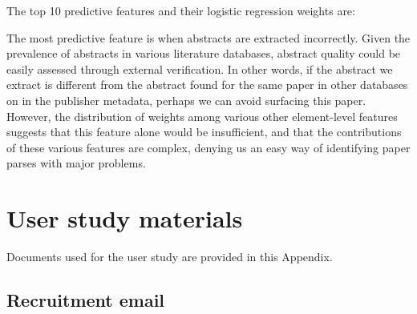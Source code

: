 The top 10 predictive features and their logistic regression weights are:

\vspace{4mm}
\vspace{4mm}

\justifying
The most predictive feature is when abstracts are extracted incorrectly. Given the prevalence of abstracts in various literature databases, abstract quality could be easily assessed through external verification. In other words, if the abstract we extract is different from the abstract found for the same paper in other databases on in the publisher metadata, perhaps we can avoid surfacing this paper. However, the distribution of weights among various other element-level features suggests that this feature alone would be insufficient, and that the contributions of these various features are complex, denying us an easy way of identifying paper parses with major problems.

\section{User study materials}
\label{app:user_study_supplement}

Documents used for the user study are provided in this Appendix.

\subsection{Recruitment email}
\label{app:recruitment_email}


